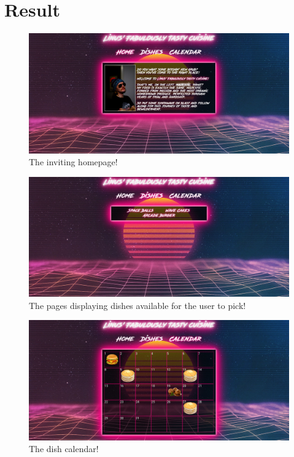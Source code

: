 \documentclass[a4paper]{scrartcl}
\begin{document}
\section{Result}
\begin{figure}[H]
  \begin{center}
    \includegraphics[scale=0.3]{Scr1.jpg}
    \caption{The inviting homepage!}
    \label{fig:homepage}
  \end{center}
\end{figure}

\begin{figure}[H]
  \begin{center}
    \includegraphics[scale=0.3]{Scr2.jpg}
    \caption{The pages displaying dishes available for the user to pick!}
    \label{fig:dishes}
  \end{center}
\end{figure}

\begin{figure}[H]
  \begin{center}
    \includegraphics[scale=0.3]{Scr3.jpg}
    \caption{The dish calendar!}
    \label{fig:calendar}
  \end{center}
\end{figure}
\end{document}
